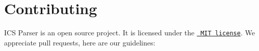 \chapter{Contributing}
\hypertarget{md__c_1_2_users_2gallo_2_one_drive_2_documents_2_s_a_x_c3_x_a9-casali_2_s_a_e___t_v___c_o_n_n_e_5dce0a03313651dc245e819b724a1ce7}{}\label{md__c_1_2_users_2gallo_2_one_drive_2_documents_2_s_a_x_c3_x_a9-casali_2_s_a_e___t_v___c_o_n_n_e_5dce0a03313651dc245e819b724a1ce7}
\label{md__c_1_2_users_2gallo_2_one_drive_2_documents_2_s_a_x_c3_x_a9-casali_2_s_a_e___t_v___c_o_n_n_e_5dce0a03313651dc245e819b724a1ce7_autotoc_md32}%
%


ICS Parser is an open source project. It is licensed under the \href{https://opensource.org/licenses/MIT}{\texttt{ MIT license}}. We appreciate pull requests, here are our guidelines\+:


